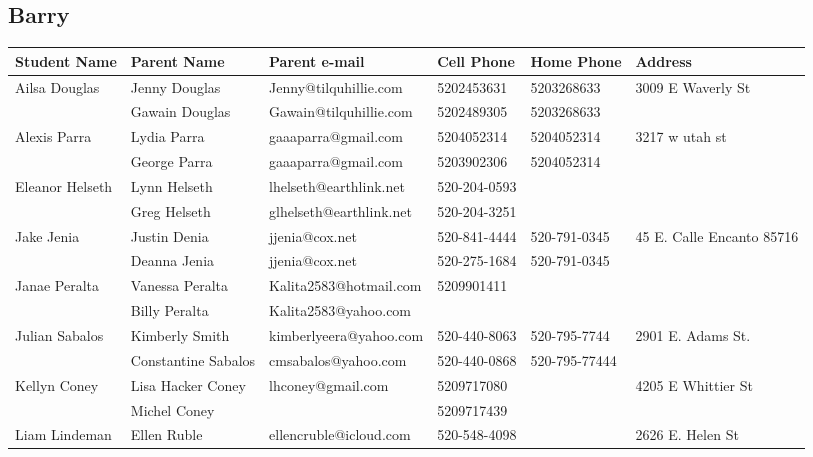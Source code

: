\documentclass[landscape]{article}\usepackage[]{graphicx}\usepackage[]{color}
\begin{document}
\subsection{Barry}
\begin{longtable}{|p{100pt}|p{100pt}|p{140pt}|p{60pt}|p{64pt}|p{120pt}|}
\textbf{Student Name} & \textbf{Parent Name} & \textbf{Parent e-mail} & \textbf{Cell Phone} & \textbf{Home Phone} & \textbf{Address}\\
\hline
\hline
\multirow{2}{100pt}{Ailsa Douglas} & Jenny Douglas & Jenny@tilquhillie.com & 5202453631 & 5203268633 & \multirow{2}{120pt}{3009 E Waverly St} \\
 & Gawain Douglas & Gawain@tilquhillie.com & 5202489305 & 5203268633 & \\
\hline
\multirow{2}{100pt}{Alexis Parra} & Lydia Parra & gaaaparra@gmail.com & 5204052314 & 5204052314 & \multirow{2}{120pt}{3217 w utah st} \\
 & George Parra & gaaaparra@gmail.com & 5203902306 & 5204052314 & \\
\hline
\multirow{2}{100pt}{Eleanor Helseth} & Lynn Helseth & lhelseth@earthlink.net & 520-204-0593 &  & \multirow{2}{120pt}{} \\
 & Greg Helseth & glhelseth@earthlink.net & 520-204-3251 &  & \\
\hline
\multirow{2}{100pt}{Jake Jenia} & Justin Denia & jjenia@cox.net & 520-841-4444 & 520-791-0345 & \multirow{2}{120pt}{45 E. Calle Encanto 85716} \\
 & Deanna Jenia & jjenia@cox.net & 520-275-1684 & 520-791-0345 & \\
\hline
\multirow{2}{100pt}{Janae Peralta} & Vanessa Peralta  & Kalita2583@hotmail.com & 5209901411 &  & \multirow{2}{120pt}{} \\
 & Billy Peralta & Kalita2583@yahoo.com &  &  & \\
\hline
\multirow{2}{100pt}{Julian Sabalos} & Kimberly Smith & kimberlyeera@yahoo.com & 520-440-8063 & 520-795-7744 & \multirow{2}{120pt}{2901 E. Adams St.} \\
 & Constantine Sabalos & cmsabalos@yahoo.com & 520-440-0868 & 520-795-77444 & \\
\hline
\multirow{2}{100pt}{Kellyn Coney} & Lisa Hacker Coney & lhconey@gmail.com & 5209717080 &  & \multirow{2}{120pt}{4205 E Whittier St} \\
 & Michel Coney &  & 5209717439 &  & \\
\hline
\multirow{2}{100pt}{Liam Lindeman} & Ellen Ruble & ellencruble@icloud.com & 520-548-4098 &  & \multirow{2}{120pt}{2626 E. Helen St} \\

\end{longtable}
\end{document}
